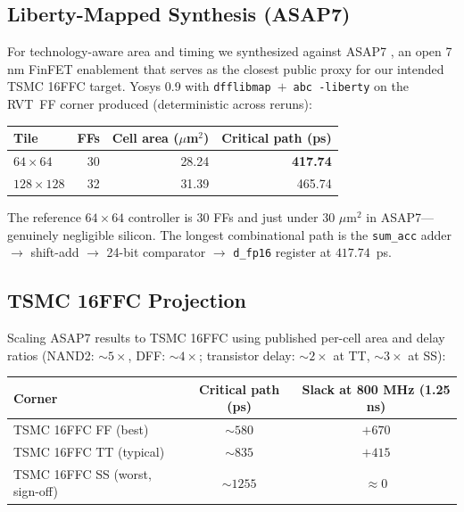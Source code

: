 \documentclass[10pt,twocolumn]{article}
\begin{document}
\subsection{Liberty-Mapped Synthesis (ASAP7)}
\label{sec:rtl_asap7}

For technology-aware area and timing we synthesized against ASAP7
\citep{clark2016asap7}, an open 7\,nm FinFET enablement that serves as
the closest public proxy for our intended TSMC 16FFC target. Yosys
0.9 with \texttt{dfflibmap}~$+$~\texttt{abc -liberty} on the RVT~FF
corner produced (deterministic across reruns):

\begin{center}
\small
\begin{tabular}{lrrr}
\toprule
Tile & FFs & Cell area ($\mu$m$^2$) & Critical path (ps) \\
\midrule
$64\times64$  & 30 & 28.24 & \textbf{417.74} \\
$128\times128$ & 32 & 31.39 & 465.74 \\
\bottomrule
\end{tabular}
\end{center}

The reference $64\times64$ controller is $30$ FFs and just under $30$
$\mu$m$^2$ in ASAP7---genuinely negligible silicon. The longest
combinational path is the
\texttt{sum\_acc} adder $\rightarrow$ shift-add $\rightarrow$ 24-bit
comparator $\rightarrow$ \texttt{d\_fp16} register at $417.74$~ps.

\subsection{TSMC 16FFC Projection}
\label{sec:rtl_16ffc}

Scaling ASAP7 results to TSMC 16FFC using published per-cell area and
delay ratios (NAND2: $\sim\!5\times$, DFF: $\sim\!4\times$; transistor
delay: $\sim\!2\times$ at TT, $\sim\!3\times$ at SS):

\begin{center}
\small
\begin{tabular}{lcc}
\toprule
Corner & Critical path (ps) & Slack at 800 MHz (1.25 ns) \\
\midrule
TSMC 16FFC FF (best)            & $\sim\!580$ & $+670$ \\
TSMC 16FFC TT (typical)         & $\sim\!835$ & $+415$ \\
TSMC 16FFC SS (worst, sign-off) & $\sim\!1255$ & $\approx 0$ \\
\bottomrule
\end{tabular}
\end{center}
\end{document}

